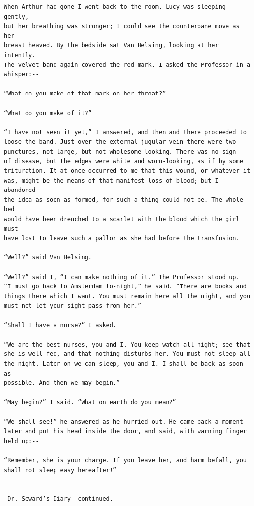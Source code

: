 \documentclass{article}
\begin{document}
\begin{verbatim}
When Arthur had gone I went back to the room. Lucy was sleeping gently,
but her breathing was stronger; I could see the counterpane move as her
breast heaved. By the bedside sat Van Helsing, looking at her intently.
The velvet band again covered the red mark. I asked the Professor in a
whisper:--

“What do you make of that mark on her throat?”

“What do you make of it?”

“I have not seen it yet,” I answered, and then and there proceeded to
loose the band. Just over the external jugular vein there were two
punctures, not large, but not wholesome-looking. There was no sign
of disease, but the edges were white and worn-looking, as if by some
trituration. It at once occurred to me that this wound, or whatever it
was, might be the means of that manifest loss of blood; but I abandoned
the idea as soon as formed, for such a thing could not be. The whole bed
would have been drenched to a scarlet with the blood which the girl must
have lost to leave such a pallor as she had before the transfusion.

“Well?” said Van Helsing.

“Well?” said I, “I can make nothing of it.” The Professor stood up.
“I must go back to Amsterdam to-night,” he said. “There are books and
things there which I want. You must remain here all the night, and you
must not let your sight pass from her.”

“Shall I have a nurse?” I asked.

“We are the best nurses, you and I. You keep watch all night; see that
she is well fed, and that nothing disturbs her. You must not sleep all
the night. Later on we can sleep, you and I. I shall be back as soon as
possible. And then we may begin.”

“May begin?” I said. “What on earth do you mean?”

“We shall see!” he answered as he hurried out. He came back a moment
later and put his head inside the door, and said, with warning finger
held up:--

“Remember, she is your charge. If you leave her, and harm befall, you
shall not sleep easy hereafter!”


_Dr. Seward’s Diary--continued._


\end{verbatim}
\end{document}
